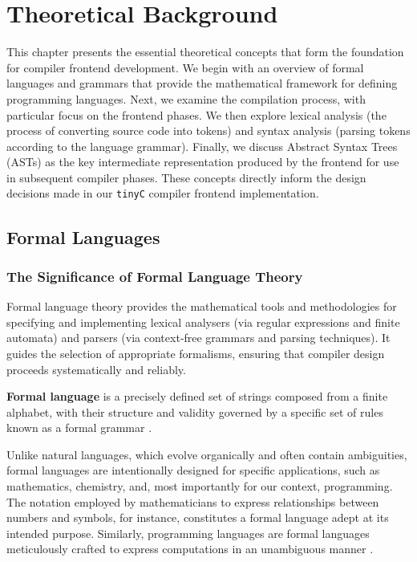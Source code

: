 \chapter{Theoretical Background}

This chapter presents the essential theoretical concepts that form the foundation for compiler frontend development. We begin with an overview of formal languages and grammars that provide the mathematical framework for defining programming languages. Next, we examine the compilation process, with particular focus on the frontend phases. We then explore lexical analysis (the process of converting source code into tokens) and syntax analysis (parsing tokens according to the language grammar). Finally, we discuss Abstract Syntax Trees (ASTs) as the key intermediate representation produced by the frontend for use in subsequent compiler phases. These concepts directly inform the design decisions made in our \texttt{tinyC} compiler frontend implementation.

\section{Formal Languages}

\subsection{The Significance of Formal Language Theory}

Formal language theory provides the mathematical tools and methodologies for specifying and implementing lexical analysers (via regular expressions and finite automata) and parsers (via context‑free grammars and parsing techniques). It guides the selection of appropriate formalisms, ensuring that compiler design proceeds systematically and reliably.

\begin{definition}
\textbf{Formal language} is a precisely defined set of strings composed from a finite alphabet, with their structure and validity governed by a specific set of rules known as a formal grammar \cite{aho2007compilers}.
\end{definition}

Unlike natural languages, which evolve organically and often contain ambiguities, formal languages are intentionally designed for specific applications, such as mathematics, chemistry, and, most importantly for our context, programming. The notation employed by mathematicians to express relationships between numbers and symbols, for instance, constitutes a formal language adept at its intended purpose. Similarly, programming languages are formal languages meticulously crafted to express computations in an unambiguous manner \cite{runestone-formal-natural-languages}.

